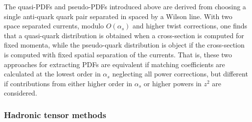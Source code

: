 The quasi-PDFs and pseudo-PDFs introduced above are derived from choosing a single anti-quark quark pair separated in spaced by a Wilson line.
With two space separated currents, modulo $O(\alpha_s)$ and higher twist corrections, one finds that a quasi-quark distribution is obtained when a cross-section is computed for fixed momenta, while the pseudo-quark distribution is object if the cross-section is computed with fixed spatial separation of the currents.  
That is, these two approaches for extracting PDFs are equivalent if matching coefficients are calculated at the lowest order in $\alpha_s$ neglecting all power corrections, but different if contributions from either higher order in $\alpha_s$ or higher powers in $z^2$ are considered.

\subsubsection{Hadronic tensor methods}


